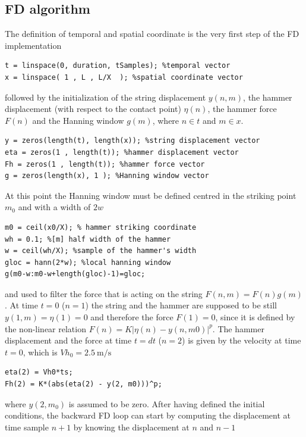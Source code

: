 \documentclass[a4paper]{article}
\begin{document}
\subsection{FD algorithm}
The definition of temporal and spatial coordinate is the very first step of the FD implementation  
\begin{verbatim}
t = linspace(0, duration, tSamples); %temporal vector 
x = linspace( 1 , L , L/X  ); %spatial coordinate vector
\end{verbatim}

followed by the initialization of the string displacement $y(n,m)$, the hammer displacement (with respect to the contact point) $\eta(n)$, the hammer force $F(n)$ and the Hanning window $g(m)$, where $n \in t$ and $m \in x$. 

\begin{verbatim}
y = zeros(length(t), length(x)); %string displacement vector
eta = zeros(1 , length(t)); %hammer displacement vector
Fh = zeros(1 , length(t)); %hammer force vector
g = zeros(length(x), 1 ); %Hanning window vector
\end{verbatim}

At this point the Hanning window must be defined centred in the striking point $m_0$ and with a width of $2w$

\begin{verbatim}
m0 = ceil(x0/X); % hammer striking coordinate
wh = 0.1; %[m] half width of the hammer
w = ceil(wh/X); %sample of the hammer's width
gloc = hann(2*w); %local hanning window
g(m0-w:m0-w+length(gloc)-1)=gloc;
\end{verbatim}

and used to filter the force that is acting on the string $F(n,m) = F(n)g(m)$. At time $t=0$ ($n=1$) the string and the hammer are supposed to be still $y(1,m) = \eta(1) = 0$ and therefore the force $F(1) = 0$, since it is defined by the non-linear relation $F(n) = K|\eta(n) - y(n,m0)|^p$. The hammer displacement and the force at time $t= dt$ ($n=2$) is given by the velocity at time $t=0$, which is $Vh_0 = \SI{2.5}{\meter\per\second}$

\begin{verbatim}
eta(2) = Vh0*ts;
Fh(2) = K*(abs(eta(2) - y(2, m0)))^p;
\end{verbatim}

where $y(2,m_0)$ is assumed to be zero. After having defined the initial conditions, the backward FD loop can start by computing the displacement at time sample $n+1$ by knowing the displacement at $n$ and $n-1$ 
\printbibliography
\end{document}
